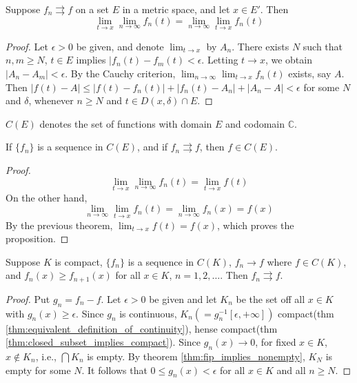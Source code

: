 \documentclass{article}
\begin{document}
\begin{multicols}{2}
\begin{theorem}
Suppose $f_n\rightrightarrows f$ on a set $E$ in a metric space, and let $x\in E'$. Then $$\lim_{t\to x}\lim_{n\to \infty}f_n(t) = \lim_{n\to \infty}\lim_{t\to x}f_n(t)$$
\end{theorem}
\begin{proof}
Let $\epsilon>0$ be given, and denote $\lim_{t\to x}$ by $A_n$.
There exists $N$ such that $n,m\geq N$, $t\in E$ implies $|f_n(t)-f_m(t)<\epsilon$.
Letting $t\to x$, we obtain $|A_n-A_m|<\epsilon$.
By the Cauchy criterion, $\lim_{n\to \infty}\lim_{t\to x}f_n(t)$ exists, say $A$.
Then $|f(t)-A|\leq |f(t)-f_n(t)|+|f_n(t)-A_n| + |A_n - A| < \epsilon$ for some $N$ and $\delta$, whenever $n\geq N$ and $t\in D(x, \delta)\cap E$.
\end{proof}

\begin{notebox}
$C(E)$ denotes the set of functions with domain $E$ and codomain $\mathbb{C}$.
\end{notebox}

\begin{theorem}
If $\{f_n\}$ is a sequence in $C(E)$, and if $f_n\rightrightarrows f$, then $f\in C(E)$.
\end{theorem}
\begin{proof}
$$\lim_{t\to x}\lim_{n\to \infty}f_n(t) = \lim_{t\to x}f(t)$$
On the other hand, 
$$\lim_{n\to \infty}\lim_{t\to x}f_n(t)=\lim_{n\to \infty}f_n(x)=f(x)$$
By the previous theorem, $\lim_{t\to x}f(t)=f(x)$, which proves the proposition.
\end{proof}

\begin{theorem}
Suppose $K$ is compact, $\{f_n\}$ is a sequence in $C(K)$, $f_n\to f$ where $f\in C(K)$, and $f_n(x)\geq f_{n+1}(x)$ for all $x\in K$, $n=1,2,\dots$. Then $f_n\rightrightarrows f$.
\end{theorem}
\begin{proof}
Put $g_n=f_n-f$. Let $\epsilon>0$ be given and let $K_n$ be the set off all $x\in K$ with $g_n(x)\geq \epsilon$. Since $g_n$ is continuous, $K_n(=g_n^{-1}[\epsilon,+\infty])$ compact(thm \ref{thm:equivalent_definition_of_continuity}), hense compact(thm \ref{thm:closed_subset_implies_compact}). Since $g_n(x)\to 0$, for fixed $x\in K$, $x\notin K_n$, i.e., $\bigcap K_n$ is empty. By theorem \ref{thm:fip_implies_nonempty}, $K_N$ is empty for some $N$. It follows that $0\leq g_n(x)<\epsilon$ for all $x\in K$ and all $n\geq N$.
\end{proof}


\end{multicols}
\end{document}
